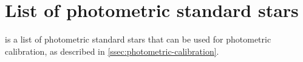 \documentclass[a4paper, 11pt, fleqn]{memoir}
\begin{document}














\backmatter

\appendix {}

\chapter{List of photometric standard stars}
\label{ch:photometric-standard-stars}

 is a list of photometric standard stars that can be used for photometric calibration, as described in \cref{ssec:photometric-calibration}.
\end{document}
